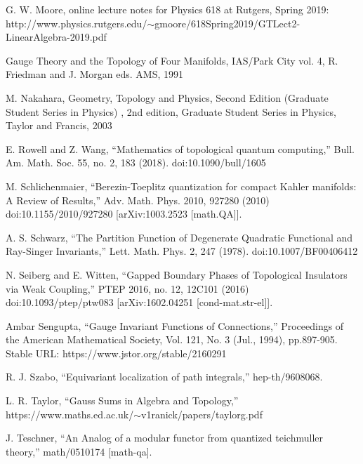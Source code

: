 \begin{enumerate}[label={[\arabic*]},leftmargin=3.2em,itemsep=2pt,topsep=4pt]
\item G. W. Moore, online lecture notes for Physics 618 at Rutgers, Spring 2019: http://www.physics.rutgers.edu/\ensuremath{\sim}gmoore/618Spring2019/GTLect2-LinearAlgebra-2019.pdf

\item Gauge Theory and the Topology of Four Manifolds, IAS/Park City vol. 4, R. Friedman and J. Morgan eds. AMS, 1991

\item M. Nakahara, Geometry, Topology and Physics, Second Edition (Graduate Student Series in Physics) , 2nd edition, Graduate Student Series in Physics, Taylor and Francis, 2003

\item E. Rowell and Z. Wang, “Mathematics of topological quantum computing,” Bull. Am. Math. Soc. 55, no. 2, 183 (2018). doi:10.1090/bull/1605

\item M. Schlichenmaier, “Berezin-Toeplitz quantization for compact Kahler manifolds: A Review of Results,” Adv. Math. Phys. 2010, 927280 (2010) doi:10.1155/2010/927280 [arXiv:1003.2523 [math.QA]].

\item A. S. Schwarz, “The Partition Function of Degenerate Quadratic Functional and Ray-Singer Invariants,” Lett. Math. Phys. 2, 247 (1978). doi:10.1007/BF00406412

\item N. Seiberg and E. Witten, “Gapped Boundary Phases of Topological Insulators via Weak Coupling,” PTEP 2016, no. 12, 12C101 (2016) doi:10.1093/ptep/ptw083 [arXiv:1602.04251 [cond-mat.str-el]].

\item Ambar Sengupta, “Gauge Invariant Functions of Connections,” Proceedings of the American Mathematical Society, Vol. 121, No. 3 (Jul., 1994), pp.897-905. Stable URL: https://www.jstor.org/stable/2160291

\item R. J. Szabo, “Equivariant localization of path integrals,” hep-th/9608068.

\item L. R. Taylor, “Gauss Sums in Algebra and Topology,” https://www.maths.ed.ac.uk/\ensuremath{\sim}v1ranick/papers/taylorg.pdf

\item J. Teschner, “An Analog of a modular functor from quantized teichmuller theory,” math/0510174 [math-qa].


\end{enumerate}
